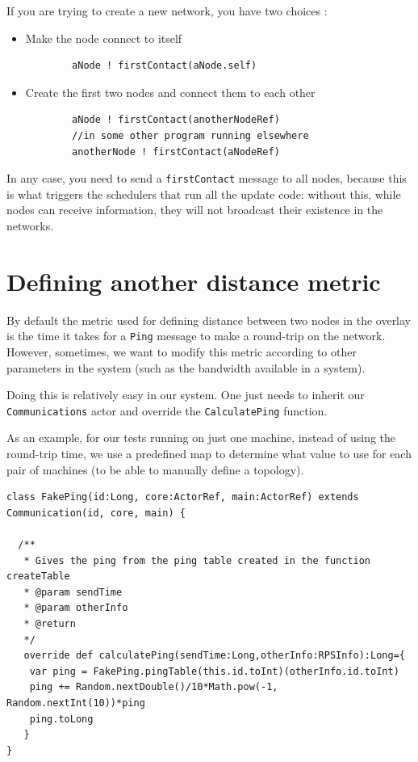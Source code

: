\documentclass[11pt,a4paper]{article}
\begin{document}
 If you are trying to create a new network, you have two choices : 
 
 \begin{itemize}
    \item Make the node connect to itself 
    \begin{verbatim}
    	aNode ! firstContact(aNode.self)
    \end{verbatim}
 	\item Create the first two nodes and connect them to each other 
 	\begin{verbatim}
 		aNode ! firstContact(anotherNodeRef)
 		//in some other program running elsewhere
 		anotherNode ! firstContact(aNodeRef)
 	\end{verbatim}
 \end{itemize}
 
 In any  case, you need to send a \verb|firstContact| message to all nodes, because this is what triggers the schedulers that run all the update code: without this, while nodes can receive information, they will not broadcast their existence in the networks.
 

\section{Defining another distance metric}

By default the metric used for defining distance between two nodes in the overlay is the time it takes for a \verb|Ping| message to make a round-trip on the network. However, sometimes, we want to modify this metric according to other parameters in the system (such as the bandwidth available in a system).

Doing this is relatively easy in our system. One just needs to inherit our \verb|Communications| actor and override the \verb|CalculatePing|  function.

As an example, for our tests running on just one machine, instead of using the round-trip time, we use a predefined map to determine what value to use for each pair of machines (to be able to manually define a topology).

\begin{verbatim}
class FakePing(id:Long, core:ActorRef, main:ActorRef) extends Communication(id, core, main) {

  /**
   * Gives the ping from the ping table created in the function createTable
   * @param sendTime
   * @param otherInfo
   * @return
   */
   override def calculatePing(sendTime:Long,otherInfo:RPSInfo):Long={
    var ping = FakePing.pingTable(this.id.toInt)(otherInfo.id.toInt)
    ping += Random.nextDouble()/10*Math.pow(-1, Random.nextInt(10))*ping
    ping.toLong
   }
}
\end{verbatim}
\end{document}
